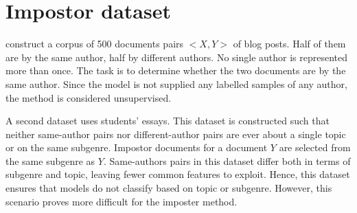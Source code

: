 \section{Impostor dataset}
\label{sec:impostor_dataset}

\citet{koppel_determining_2014} construct a corpus of 500 documents pairs $<X,Y>$ of blog posts.
Half of them are by the same author, half by different authors.
No single author is represented more than once.
The task is to determine whether the two documents are by the same author.
Since the model is not supplied any labelled samples of any author, the method is considered unsupervised.

A second dataset uses students' essays.
This dataset is constructed such that neither same-author pairs nor different-author pairs 
are ever about a single topic or on the same subgenre.
Impostor documents for a document $Y$ are selected from the same subgenre as $Y$.
Same-authors pairs in this dataset differ both in terms of subgenre and topic, leaving fewer common features to exploit.
Hence, this dataset ensures that models do not classify based on topic or subgenre.
However, this scenario proves more difficult for the imposter method.